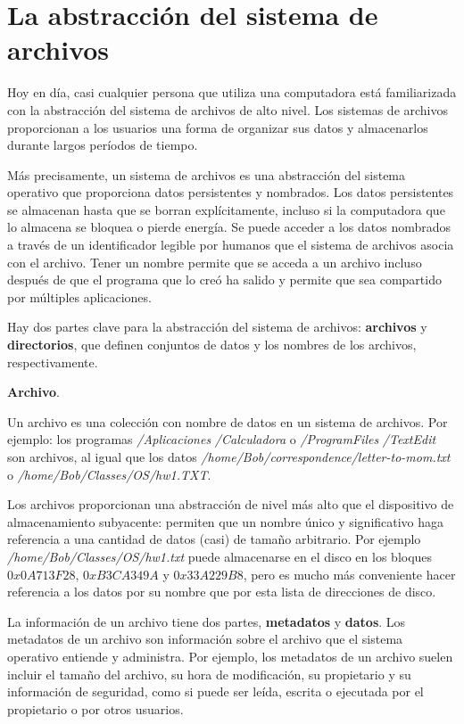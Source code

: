 \documentclass[10pt]{book}
\begin{document}
\section{La abstracción del sistema de archivos}
Hoy en día, casi cualquier persona que utiliza una computadora está familiarizada con la abstracción del sistema de archivos de alto nivel. Los sistemas de archivos proporcionan a los usuarios una forma de organizar sus datos y almacenarlos durante largos períodos de tiempo.

Más precisamente, un sistema de archivos es una abstracción del sistema operativo que proporciona datos persistentes y nombrados. Los datos persistentes se almacenan hasta que se borran explícitamente, incluso si la computadora que lo almacena se bloquea o pierde energía. Se puede acceder a los datos nombrados a través de un identificador legible por humanos que el sistema de archivos asocia con el archivo. Tener un nombre permite que se acceda a un archivo incluso después de que el programa que lo creó ha salido y permite que sea compartido por múltiples aplicaciones.

Hay dos partes clave para la abstracción del sistema de archivos: \textbf{archivos} y \textbf{directorios}, que definen conjuntos de datos y los nombres de los archivos, respectivamente.

\textbf{Archivo}. 

Un archivo es una colección con nombre de datos en un sistema de archivos. Por ejemplo: los programas \textit{/Aplicaciones} \textit{/Calculadora} o \textit{/ProgramFiles} \textit{/TextEdit} son archivos, al igual que los datos \textit{/home/Bob/correspondence/letter-to-mom.txt} o \textit{/home/Bob/Classes/OS/hw1.TXT}.

Los archivos proporcionan una abstracción de nivel más alto que el dispositivo de almacenamiento subyacente: permiten que un nombre único y significativo haga referencia a una cantidad de datos (casi) de tamaño arbitrario. Por ejemplo \textit{/home/Bob/Classes/OS/hw1.txt} puede almacenarse en el disco en los bloques $0x0A713F28$, $0xB3CA349A$ y $0x33A229B8$, pero es mucho más conveniente hacer referencia a los datos por su nombre que por esta lista de direcciones de disco.

La información de un archivo tiene dos partes, \textbf{metadatos} y \textbf{datos}. Los metadatos de un archivo son información sobre el archivo que el sistema operativo entiende y administra. Por ejemplo, los metadatos de un archivo suelen incluir el tamaño del archivo, su hora de modificación, su propietario y su información de seguridad, como si puede ser leída, escrita o ejecutada por el propietario o por otros usuarios.
\end{document}

